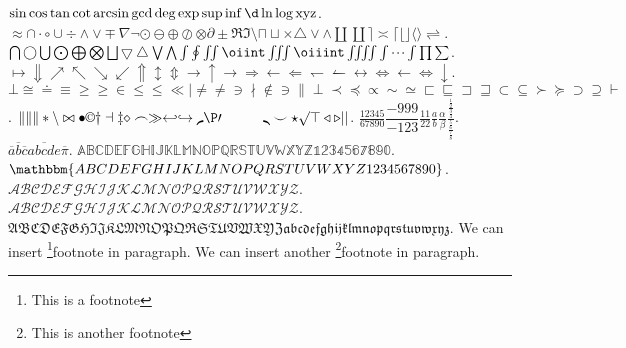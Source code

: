 \documentclass{ctexart}
\begin{document}
\(\sin \cos \tan \cot \arcsin \gcd \deg \exp \sup \inf \d \ln \log
\operatorname{xyz}\).
\(\approx \cap \cdot \circ \cup \div \land \lor \mp \nabla \neg \odot
  \ominus \oplus \oslash \otimes \partial \pm \Re \Im \setminus \sqcap
  \sqcup \times \triangle \vee \wedge \amalg \coprod \rceil \asymp
\lceil \lfloor \rfloor \langle \rangle \rightleftharpoons \).
\(\bigcap \bigcirc \bigcup \bigodot \bigoplus \bigotimes \bigsqcup
  \bigtriangledown \bigtriangleup \bigvee \bigwedge \int \oint \iint
\oiint \iiint \oiiint \iiiint \idotsint \prod \sum \).
\(\mapsto \Downarrow \nearrow \nwarrow \searrow \swarrow \Uparrow
  \updownarrow \Updownarrow \to \uparrow \rightarrow \Rightarrow
  \leftarrow \Leftarrow \leftharpoondown \leftharpoonup \leftrightarrow
\Leftrightarrow \gets \iff \downarrow \).
\(\bot \cong \doteq \equiv \ge \geq \in \le \leq \ll \mid \ne \neq
  \ni \nmid \notin \owns \parallel \perp \prec \preceq \propto \sim
  \simeq \sqsubset \sqsubseteq \sqsupset \sqsupseteq \subset \subseteq
\succ \succeq \supset \supseteq \vdash \).
\(\| \lVert \rVert \ast \backslash \bowtie \bullet \copyright \dagger
  \dashv \ddagger \diamond \frown \gg \hookleftarrow \hookrightarrow
  \lmoustache \P \prime \quad \qquad \rmoustache \smile \star \surd
\top \triangleleft \triangleright \lvert \rvert \).
\(\frac{12345}{67890} \dfrac{-999}{-123} \tfrac{11}{22} \frac{a}{b}
  \frac{\alpha}{\beta}
\frac{\frac{\frac{1}{2}}{\frac{3}{4}}}{\frac{\frac{5}{6}}{\frac{7}{8}}}\).
\(\overline{a} \overline{b} \overline{c} \overline{abcde}  \overline{\pi} \).
\(\mathbb{ABCDEFGHIJKLMNOPQRSTUVWXYZ1234567890} \).
\(\mathbbm{ABCDEFGHIJKLMNOPQRSTUVWXYZ1234567890} \).
\(\mathcal{ABCDEFGHIJKLMNOPQRSTUVWXYZ}\).
\(\mathscr{ABCDEFGHIJKLMNOPQRSTUVWXYZ}\).
\(\mathfrak{ABCDEFGHIJKLMNOPQRSTUVWXYZabcdefghijklmnopqrstuvwxyz}\).
We can insert \footnote{This is a footnote}{footnote} in paragraph.
We can insert another \footnote{This is another footnote}{footnote}
in paragraph.
\end{document}
